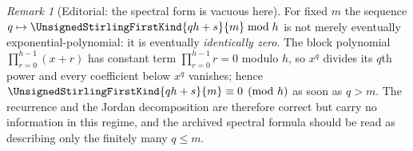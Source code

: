 \documentclass[11pt,a4paper,oneside,openany]{book}
\theoremstyle{definition}
\theoremstyle{remark}
\newtheorem{remark}[theorem]{Remark}
\begin{document}
\begin{remark}[Editorial: the spectral form is vacuous here]
For fixed $m$ the sequence $q\mapsto\UnsignedStirlingFirstKind{qh+s}{m}\bmod h$
is not merely eventually exponential-polynomial: it is eventually
\emph{identically zero}.  The block polynomial
$\prod_{r=0}^{h-1}(x+r)$ has constant term $\prod_{r=0}^{h-1}r=0$ modulo $h$,
so $x^q$ divides its $q$th power and every coefficient below $x^q$ vanishes;
hence $\UnsignedStirlingFirstKind{qh+s}{m}\equiv0\pmod h$ as soon as $q>m$.
The recurrence and the Jordan decomposition are therefore correct but carry no
information in this regime, and the archived spectral formula should be read as
describing only the finitely many $q\le m$.
\end{remark}
\end{document}

